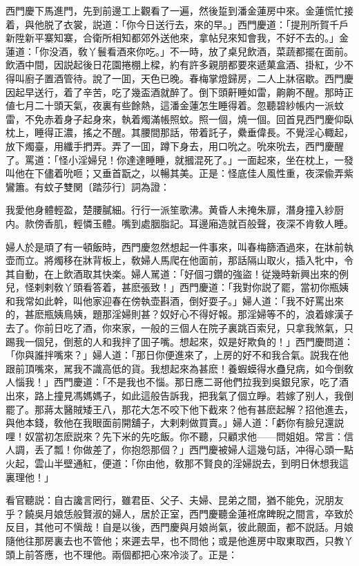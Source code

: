 西門慶下馬進門，先到前邊工上觀看了一遍，然後踅到潘金蓮房中來。金蓮慌忙接着，與他脱了衣裳，説道：「你今日送行去，來的早。」西門慶道：「提刑所賀千戶新陞新平寨知寨，合衛所相知都郊外送他來，拿帖兒來知會我，不好不去的。」金蓮道：「你没酒，敎丫鬟看酒來你吃。」不一時，放了桌兒飲酒，菜蔬都擺在面前。飲酒中間，因説起後日花園捲棚上樑，約有許多親朋都要來遞菓盒酒、掛紅，少不得叫廚子置酒管待。說了一囬，天色已晚。春梅掌燈歸房，二人上牀宿歇。西門慶因起早送行，着了辛苦，吃了幾盃酒就醉了。倒下頭鼾睡如雷，齁齁不醒。那時正値七月二十頭天氣，夜裏有些餘熱，這潘金蓮怎生睡得着。忽聽碧紗帳内一派蚊雷，不免赤着身子起身來，執着燭滿帳照蚊。照一個，燒一個。回首見西門慶仰臥枕上，睡得正濃，搖之不醒。其腰間那話，带着託子，纍垂偉長。不覺淫心輙起，放下燭臺，用纖手捫弄。弄了一囬，蹲下身去，用口吮之。吮來吮去，西門慶醒了。罵道：「怪小淫婦兒！你達達睡睡，就摑混死了。」一面起來，坐在枕上，一發叫他在下儘着吮咂；又垂首翫之，以暢其美。正是：怪底佳人風性重，夜深偸弄紫鸞簫。有蚊子雙関〔踏莎行〕詞為證：

\begin{myquote}
我愛他身體輕盈，楚腰膩細。行行一派笙歌沸。黄昏人未掩朱扉，潛身撞入紗厨内。款傍香肌，輕憐玉體。嘴到處胭脂記。耳邊廂造就百般聲，夜深不肯敎人睡。
\end{myquote}

婦人於是頑了有一頓飯時，西門慶忽然想起一件事來，叫春梅篩酒過來，在牀前執壶而立。將燭移在牀背板上，敎婦人馬爬在他面前，那話隔山取火，插入牝中，令其自動，在上飲酒取其快楽。婦人駡道：「好個刁鑽的強盜！従幾時新興出來的例兒，怪剌剌敎丫頭看答着，甚麽張致！」西門慶道：「我對你説了罷，當初你瓶姨和我常如此幹，叫他家迎春在傍執壶斟酒，倒好耍子。」婦人道：「我不好罵出來的，甚麽瓶姨鳥姨，題那淫婦則甚？奴好心不得好報。那淫婦等不的，浪着嫁漢子去了。你前日吃了酒，你來家，一般的三個人在院子裏跳百索兒，只拿我煞氣，只踢我一個兒，倒惹的人和我拌了囬子嘴。想起來，奴是好欺負的！」西門慶問道：「你與誰拌嘴來？」婦人道：「那日你便進來了，上房的好不和我合氣。説我在他跟前頂嘴來，駡我不識高低的貨。我想起來為甚麽！養蝦蟆得水蠱兒病，如今倒敎人惱我！」西門慶道：「不是我也不惱。那日應二哥他們拉我到吳銀兒家，吃了酒出來，路上撞見馮媽媽子，如此這般告訴我，把我氣了個立睜。若嫁了别人，我倒罷了。那蔣太醫賊矮王八，那花大怎不咬下他下截來？他有甚麽起解？招他進去，與他本錢，敎他在我眼面前開舖子，大剌剌做買賣。」婦人道：「虧你有臉兒還説哩！奴當初怎麽説來？先下米的先吃飯。你不聽，只顧求他——問姐姐。常言：信人調，丢了瓢！你做差了，你抱怨那個？」西門慶被婦人這幾句話，冲得心頭一點火起，雲山半壁通紅，便道：「你由他，敎那不賢良的淫婦説去，到明日休想我這裏理他！」

看官聽説：自古讒言罔行，雖君臣、父子、夫婦、昆弟之間，猶不能免，況朋友乎？饒吳月娘恁般賢淑的婦人，居於正室，西門慶聽金蓮袵席睥睨之間言，卒致於反目，其他可不愼哉！自是以後，西門慶與月娘尚氣，彼此覿面，都不説話。月娘隨他往那房裏去也不管他；來遲去早，也不問他；或是他進房中取東取西，只教丫頭上前答應，也不理他。兩個都把心來冷淡了。正是：

